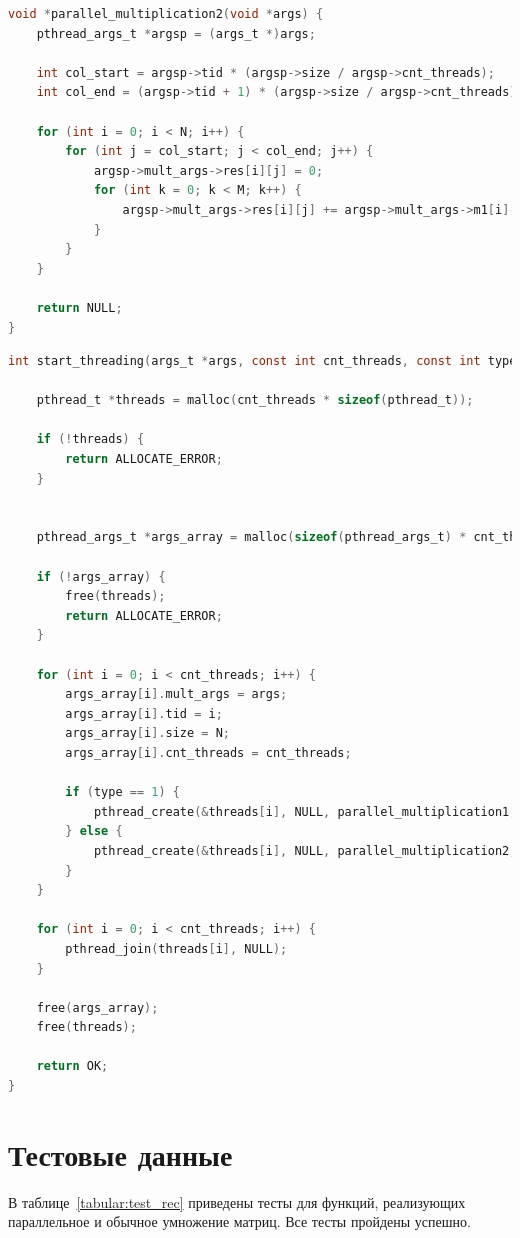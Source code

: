 \documentclass[12pt]{report}
\begin{document}
\begin{lstlisting}[label=some-code,caption=Функция умножения матриц параллельно. Способ №2,language=C]
void *parallel_multiplication2(void *args) {
	pthread_args_t *argsp = (args_t *)args;

	int col_start = argsp->tid * (argsp->size / argsp->cnt_threads);
	int col_end = (argsp->tid + 1) * (argsp->size / argsp->cnt_threads);

	for (int i = 0; i < N; i++) {
		for (int j = col_start; j < col_end; j++) {
			argsp->mult_args->res[i][j] = 0;
			for (int k = 0; k < M; k++) {
				argsp->mult_args->res[i][j] += argsp->mult_args->m1[i][k] * argsp->mult_args->m2[k][j];
			}
		}
	}

	return NULL;
}
\end{lstlisting}

\begin{lstlisting}[label=some-code,caption=Функция создания потоков,language=C]
int start_threading(args_t *args, const int cnt_threads, const int type) {

	pthread_t *threads = malloc(cnt_threads * sizeof(pthread_t));

	if (!threads) {
		return ALLOCATE_ERROR;
	}


	pthread_args_t *args_array = malloc(sizeof(pthread_args_t) * cnt_threads);

	if (!args_array) {
		free(threads);
		return ALLOCATE_ERROR;
	}

	for (int i = 0; i < cnt_threads; i++) {
		args_array[i].mult_args = args;
		args_array[i].tid = i;
		args_array[i].size = N;
		args_array[i].cnt_threads = cnt_threads;

		if (type == 1) {
			pthread_create(&threads[i], NULL, parallel_multiplication1, &args_array[i]);
		} else {
			pthread_create(&threads[i], NULL, parallel_multiplication2, &args_array[i]);
		}
	}

	for (int i = 0; i < cnt_threads; i++) {
		pthread_join(threads[i], NULL);
	}

	free(args_array);
	free(threads);

	return OK;
}

\end{lstlisting}

\section{Тестовые данные}

В таблице~\ref{tabular:test_rec} приведены тесты для функций, реализующих параллельное и обычное умножение матриц. Все тесты пройдены успешно.
\end{document}
